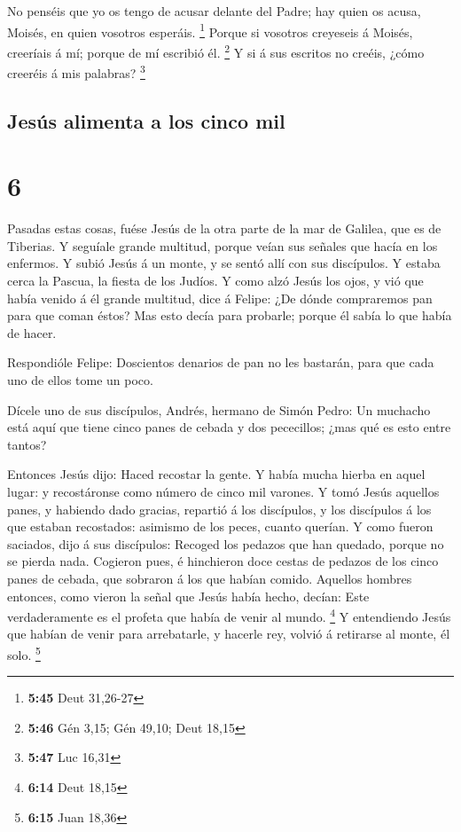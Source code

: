  No penséis que yo os tengo de acusar delante del Padre;
hay quien os acusa, Moisés, en quien vosotros esperáis. \footnote{\textbf{5:45}
  Deut 31,26-27}  Porque si vosotros creyeseis á Moisés,
creeríais á mí; porque de mí escribió él. \footnote{\textbf{5:46} Gén
  3,15; Gén 49,10; Deut 18,15}  Y si á sus escritos no
creéis, ¿cómo creeréis á mis palabras? \footnote{\textbf{5:47} Luc 16,31}

\hypertarget{jesuxfas-alimenta-a-los-cinco-mil}{%
\subsection{Jesús alimenta a los cinco
mil}\label{jesuxfas-alimenta-a-los-cinco-mil}}

\hypertarget{section-5}{%
\section{6}\label{section-5}}

 Pasadas estas cosas, fuése Jesús de la otra parte de la mar
de Galilea, que es de Tiberias.  Y seguíale grande multitud,
porque veían sus señales que hacía en los enfermos.  Y subió
Jesús á un monte, y se sentó allí con sus discípulos.  Y
estaba cerca la Pascua, la fiesta de los Judíos.  Y como
alzó Jesús los ojos, y vió que había venido á él grande multitud, dice á
Felipe: ¿De dónde compraremos pan para que coman éstos?  Mas
esto decía para probarle; porque él sabía lo que había de hacer.

 Respondióle Felipe: Doscientos denarios de pan no les
bastarán, para que cada uno de ellos tome un poco.

 Dícele uno de sus discípulos, Andrés, hermano de Simón
Pedro:  Un muchacho está aquí que tiene cinco panes de
cebada y dos pececillos; ¿mas qué es esto entre tantos?

 Entonces Jesús dijo: Haced recostar la gente. Y había
mucha hierba en aquel lugar: y recostáronse como número de cinco mil
varones.  Y tomó Jesús aquellos panes, y habiendo dado
gracias, repartió á los discípulos, y los discípulos á los que estaban
recostados: asimismo de los peces, cuanto querían.  Y como
fueron saciados, dijo á sus discípulos: Recoged los pedazos que han
quedado, porque no se pierda nada.  Cogieron pues, é
hinchieron doce cestas de pedazos de los cinco panes de cebada, que
sobraron á los que habían comido.  Aquellos hombres
entonces, como vieron la señal que Jesús había hecho, decían: Este
verdaderamente es el profeta que había de venir al mundo. \footnote{\textbf{6:14}
  Deut 18,15}  Y entendiendo Jesús que habían de venir para
arrebatarle, y hacerle rey, volvió á retirarse al monte, él solo.
\footnote{\textbf{6:15} Juan 18,36}

